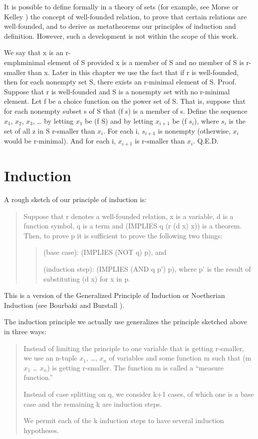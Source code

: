 \documentclass[10pt]{book}
\newenvironment{pubcrown}{\begin{quote}}{\end{quote}}
\begin{document}
It is  possible to define formally in a  theory
of sets (for example, see Morse \cite{MORSE} or Kelley \cite{KELLEY}) the concept of well-founded relation, to
prove that certain relations are well-founded, and to derive
as metatheorems our principles of induction and definition.  However, such
a development is not within the scope of this work.

We say that x is an r-\\emph{minimal
element of} S provided x is a member of S and no member of S
is r-smaller than x.  Later in this chapter we  use the fact that if
r is well-founded, then for each nonempty set S, there exists
an r-minimal element of S.  Proof.  Suppose that r is well-founded and S is a nonempty set with no r-minimal element.
Let f be a choice function on the power set of S.  That is, suppose
that for each nonempty subset s of S that (f s) is a member of s.
Define the sequence $x_{1}$, $x_{2}$, $x_{3}$, \ldots{} by
letting $x_{1}$ be (f S) and by letting $x_{i+1}$ be (f $s_{i}$), where $s_{i}$
is the set of all z in S r-smaller than $x_{i}$.  
For each i, $s_{i+1}$ is nonempty (otherwise,
$x_{i}$ would be r-minimal).  And for each i, $x_{i+1}$ is 
r-smaller than $x_{i}$.  Q.E.D.

\section{Induction}
A rough
sketch of our  principle of induction is:
\begin{pubcrown}
Suppose that r denotes a well-founded
relation,  x is a variable, d is a function symbol,
q is a term and (IMPLIES q (r (d x) x)) is a theorem.
Then, to prove p it is sufficient to prove
the following two things:
\begin{pubcrown}
(base case): (IMPLIES (NOT q) p), and

(induction step):  (IMPLIES (AND q p') p),
where p' is the result of substituting (d x) for x in p.
\end{pubcrown}
\end{pubcrown}
This is  a version of the Generalized Principle of Induction or Noetherian
Induction (see Bourbaki \cite{BOURBAKI} and Burstall \cite{BURSTALL}).

The induction principle we actually use generalizes the principle sketched above in three ways:~~
\begin{pubcrown}
Instead of
limiting the principle to one variable that is getting r-smaller, we use an n-tuple $x_{1}$, \ldots{}, $x_{n}$ of variables and  some function m
such that (m $x_{1}$ \ldots{} $x_{n}$) is getting r-smaller.  The function m
is called a ``measure function.''  

Instead of case splitting
on q, we consider k+1 cases,  of which one is a base case and the
remaining k are induction steps.

We 
permit each of the k induction steps to have several induction
hypotheses.
\end{pubcrown}
\end{document}
